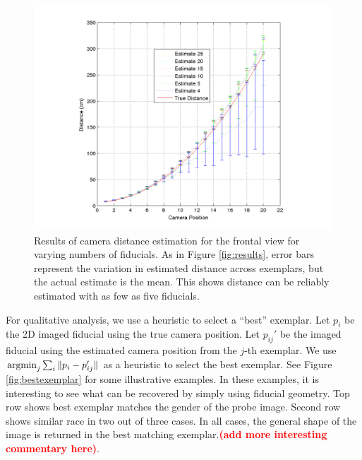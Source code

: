 \documentclass[runningheads]{llncs}
\newcommand{\argmin}{\operatornamewithlimits{argmin}}
\newcommand {\afbnote} [1] {{\bf \textcolor{red}{(#1)}}}
\begin{document}
\begin{figure}[h]
\centering
\includegraphics[width=1\linewidth]{resources/figures/errorbar_frontal_lessfiducials.png}
\caption{
Results of camera distance estimation for the frontal view for varying numbers of fiducials.
As in Figure \ref{fig:results}, error bars represent the variation in estimated distance across exemplars, but the actual estimate is the mean.
This shows distance can be reliably estimated with as few as five fiducials.
}
\label{fig:error_bar_frontal_lessfiducials}
\end{figure}

For qualitative analysis, we use a heuristic to select a ``best'' exemplar.  Let $p_i$ be the 2D imaged fiducial using the true camera position.  
Let $p_{ij}'$ be the imaged fiducial using the estimated camera position from the $j$-th exemplar.
We use $\argmin_j \sum_i \|p_i - p_{ij}'\|$ as a heuristic to select the best exemplar. 
See Figure \ref{fig:bestexemplar} for some illustrative examples.  
In these examples, it is interesting to see what can be recovered by simply using fiducial geometry.  
Top row shows best exemplar matches the gender of the probe image.  
Second row shows similar race in two out of three cases.  
In all cases, the general shape of the image is returned in the best matching exemplar.\afbnote{add more interesting commentary here}.
\end{document}
